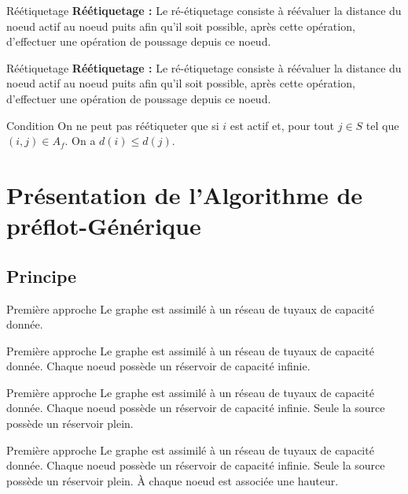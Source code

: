 \documentclass[hyperref={},
xcolor={dvipsnames,svgnames,table},10pt]{beamer}
\begin{document}
\begin{frame}{Réétiquetage}
	\textbf{Réétiquetage :} Le ré-étiquetage consiste à réévaluer la distance du noeud actif au
	noeud puits afin qu'il soit possible, après cette opération, d'effectuer une opération de
	poussage depuis ce noeud.
\end{frame}

\begin{frame}{Réétiquetage}
	\textbf{Réétiquetage :} Le ré-étiquetage consiste à réévaluer la distance du noeud actif au
	noeud puits afin qu'il soit possible, après cette opération, d'effectuer une opération de
	poussage depuis ce noeud.
	\begin{alertblock}{Condition}
		On ne peut pas réétiqueter que si $i$ est actif et, pour tout $j \in S$ tel
		que $(i,j) \in A_f$. On a $d (i)\leq d (j)$. 
	\end{alertblock}
\end{frame}

\section{Présentation de l'Algorithme de préflot-Générique}
\subsection{Principe}

\begin{frame}{Première approche}
	Le graphe est assimilé à un réseau de tuyaux de capacité donnée.\vfill
\end{frame}

\begin{frame}{Première approche}
	Le graphe est assimilé à un réseau de tuyaux de capacité donnée.\vfill
	Chaque noeud possède un réservoir de capacité infinie.\vfill
\end{frame}

\begin{frame}{Première approche}
	Le graphe est assimilé à un réseau de tuyaux de capacité donnée.\vfill
	Chaque noeud possède un réservoir de capacité infinie.\vfill
	Seule la source possède un réservoir plein. \vfill
\end{frame}

\begin{frame}{Première approche}
	Le graphe est assimilé à un réseau de tuyaux de capacité donnée.\vfill
	Chaque noeud possède un réservoir de capacité infinie.\vfill
	Seule la source possède un réservoir plein. \vfill
	À chaque noeud est associée une hauteur.\vfill
\end{frame}
\end{document}
